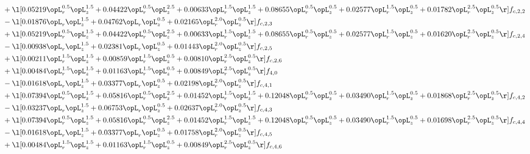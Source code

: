 \begin{alignat}{2}
& + \l[  0.05219 \opL_r^{0.5} \opL_z^{1.5} +  0.04422 \opL_r^{0.5} \opL_z^{2.5} +  0.00633 \opL_r^{1.5} \opL_z^{1.5} +  0.08655 \opL_r^{0.5} \opL_z^{0.5} +  0.02577 \opL_r^{1.5} \opL_z^{0.5} +  0.01782 \opL_r^{2.5} \opL_z^{0.5}  \r] f_{c,2,2} \nonumber \\ 
& - \l[  0.01876 \opL_r \opL_z^{1.5} +  0.04762 \opL_r \opL_z^{0.5} +  0.02165 \opL_r^{2.0} \opL_z^{0.5}  \r] f_{c,2,3} \nonumber \\ 
& + \l[  0.05219 \opL_r^{0.5} \opL_z^{1.5} +  0.04422 \opL_r^{0.5} \opL_z^{2.5} +  0.00633 \opL_r^{1.5} \opL_z^{1.5} +  0.08655 \opL_r^{0.5} \opL_z^{0.5} +  0.02577 \opL_r^{1.5} \opL_z^{0.5} +  0.01620 \opL_r^{2.5} \opL_z^{0.5}  \r] f_{c,2,4} \nonumber \\ 
& - \l[  0.00938 \opL_r \opL_z^{1.5} +  0.02381 \opL_r \opL_z^{0.5} +  0.01443 \opL_r^{2.0} \opL_z^{0.5}  \r] f_{c,2,5} \nonumber \\ 
& + \l[  0.00211 \opL_r^{1.5} \opL_z^{1.5} +  0.00859 \opL_r^{1.5} \opL_z^{0.5} +  0.00810 \opL_r^{2.5} \opL_z^{0.5}  \r] f_{c,2,6} \nonumber \\ 
& + \l[  0.00484 \opL_r^{1.5} \opL_z^{1.5} +  0.01163 \opL_r^{1.5} \opL_z^{0.5} +  0.00849 \opL_r^{2.5} \opL_z^{0.5}  \r] f_{4,0} \nonumber \\ 
& - \l[  0.01618 \opL_r \opL_z^{1.5} +  0.03377 \opL_r \opL_z^{0.5} +  0.02198 \opL_r^{2.0} \opL_z^{0.5}  \r] f_{c,4,1} \nonumber \\ 
& + \l[  0.07394 \opL_r^{0.5} \opL_z^{1.5} +  0.05816 \opL_r^{0.5} \opL_z^{2.5} +  0.01452 \opL_r^{1.5} \opL_z^{1.5} +  0.12048 \opL_r^{0.5} \opL_z^{0.5} +  0.03490 \opL_r^{1.5} \opL_z^{0.5} +  0.01868 \opL_r^{2.5} \opL_z^{0.5}  \r] f_{c,4,2} \nonumber \\ 
& - \l[  0.03237 \opL_r \opL_z^{1.5} +  0.06753 \opL_r \opL_z^{0.5} +  0.02637 \opL_r^{2.0} \opL_z^{0.5}  \r] f_{c,4,3} \nonumber \\ 
& + \l[  0.07394 \opL_r^{0.5} \opL_z^{1.5} +  0.05816 \opL_r^{0.5} \opL_z^{2.5} +  0.01452 \opL_r^{1.5} \opL_z^{1.5} +  0.12048 \opL_r^{0.5} \opL_z^{0.5} +  0.03490 \opL_r^{1.5} \opL_z^{0.5} +  0.01698 \opL_r^{2.5} \opL_z^{0.5}  \r] f_{c,4,4} \nonumber \\ 
& - \l[  0.01618 \opL_r \opL_z^{1.5} +  0.03377 \opL_r \opL_z^{0.5} +  0.01758 \opL_r^{2.0} \opL_z^{0.5}  \r] f_{c,4,5} \nonumber \\ 
& + \l[  0.00484 \opL_r^{1.5} \opL_z^{1.5} +  0.01163 \opL_r^{1.5} \opL_z^{0.5} +  0.00849 \opL_r^{2.5} \opL_z^{0.5}  \r] f_{c,4,6} \nonumber \\ 

\end{alignat}

